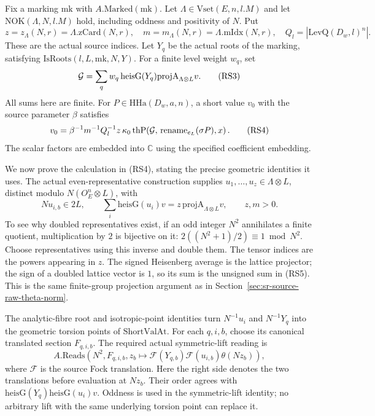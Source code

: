 Fix a marking \(\mathrm{mk}\) with \(A.\mathrm{Marked}(\mathrm{mk})\).
Let \(\Lambda\in\mathrm{Vset}(E,n,l.M)\) and let
\(\mathrm{NOK}(\Lambda,N,l.M)\) hold, including oddness
and positivity of \(N\).  Put
\[
 z=z_\Lambda(N,r)=\Lambda.\mathrm{zCard}(N,r),\quad
 m=m_\Lambda(N,r)=\Lambda.\mathrm{mIdx}(N,r),\quad
 Q_l=\left|\mathrm{LevQ}(D_w,l)^n\right|.
\]
These are the actual source indices.  Let \(Y_q\) be
the actual roots of the marking, satisfying
\(\mathrm{IsRoots}(l,L,\mathrm{mk},N,Y)\).
For a finite level weight \(w_q\), set
\[
 {\cal G}=\sum_q w_q\,\mathrm{heisG}(Y_q)
             \mathrm{projA}_{\Lambda\otimes L}v .
 \tag{RS3}\label{eq:sr-source-reading-gphi}
\]
All sums here are finite.
For \(P\in\mathrm{HHa}(D_w,a,n)\), a short value \(v_0\)
with the source parameter \(\beta\) satisfies
\[
 v_0=\beta^{-1}m^{-1}Q_l^{-1}z\,\kappa_0\,
     \mathrm{thP}\!\left(
       {\cal G},\,
       \mathrm{rename}_{e_L}(\sigma P),x\right).
 \tag{RS4}\label{eq:sr-source-short-value-normalization}
\]
The scalar factors are embedded into \(\mathbb C\) using
the specified coefficient embedding.

We now prove the calculation in (RS4), stating the precise
geometric identities it uses.
The actual even-representative construction supplies
\(u_1,\ldots,u_z\in\Lambda\otimes L\), distinct modulo
\(N(O_E^n\otimes L)\), with
\[
 N u_{i,b}\in2L,\qquad
 \sum_i\mathrm{heisG}(u_i)v
                    =z\,\mathrm{projA}_{\Lambda\otimes L}v,
       \qquad z,m>0.
 \tag{RS5}\label{eq:sr-source-even-representatives}
\]
To see why doubled representatives exist, if an odd
integer \(N^2\) annihilates a finite quotient, multiplication
by \(2\) is bijective on it: \(2((N^2+1)/2)\equiv1\bmod N^2\).
Choose representatives using this inverse and double them.
The tensor indices are the powers appearing in \(z\).
The signed Heisenberg average is the lattice projector;
the sign of a doubled lattice vector is \(1\), so its
sum is the unsigned sum in (RS5).
This is the same finite-group projection argument as in
Section~\ref{sec:sr-source-raw-theta-norm}.

The analytic-fibre root and isotropic-point identities
turn \(N^{-1}u_i\) and \(N^{-1}Y_q\) into the geometric
torsion points of \(\mathrm{ShortValAt}\).
For each \(q,i,b\), choose its canonical translated
section \(F_{q,i,b}\).
The required actual symmetric-lift reading is
\[
 A.\mathrm{Reads}\left(N^2,F_{q,i,b},
   z_b\longmapsto
   \mathcal F(Y_{q,b})\mathcal F(u_{i,b})\theta(Nz_b)\right),
 \tag{RS6}\label{eq:sr-source-canonical-translation-reading}
\]
where \(\mathcal F\) is the source Fock translation.
Here the right side denotes the two translations before
evaluation at \(Nz_b\).
Their order agrees with
\(\mathrm{heisG}(Y_q)\mathrm{heisG}(u_i)v\).
Oddness is used in the symmetric-lift identity; no
arbitrary lift with the same underlying torsion point
can replace it.

